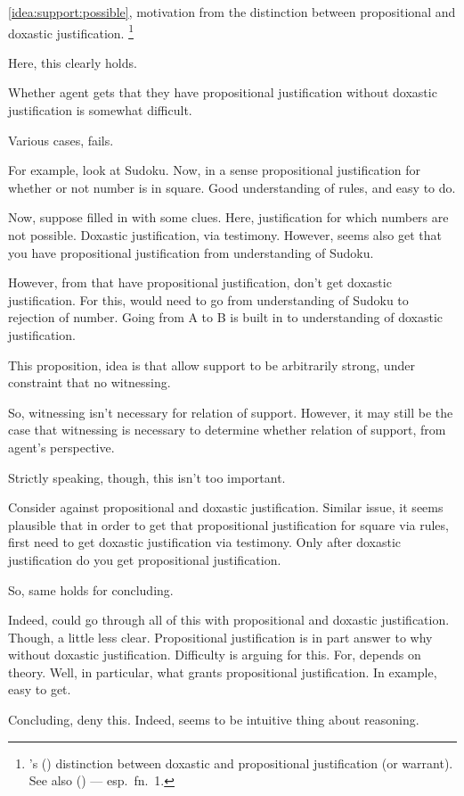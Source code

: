 \begin{note}
  \autoref{idea:support:possible}, motivation from the distinction between propositional and doxastic justification.%
  \footnote{
    \citeauthor{Firth:1978vi}'s (\citeyear{Firth:1978vi}) distinction between doxastic and propositional justification (or warrant).
    See also \citeauthor{Silva:2020aa} (\citeyear{Silva:2020aa}) --- esp.\ fn.\ 1.
  }

  Here, this clearly holds.

  Whether agent gets that they have propositional justification without doxastic justification is somewhat difficult.

  Various cases, fails.

  For example, look at Sudoku.
  Now, in a sense propositional justification for whether or not number is in square.
  Good understanding of rules, and easy to do.

  Now, suppose filled in with some clues.
  Here, justification for which numbers are not possible.
  Doxastic justification, via testimony.
  However, seems also get that you have propositional justification from understanding of Sudoku.

  However, from that have propositional justification, don't get doxastic justification.
  For this, would need to go from understanding of Sudoku to rejection of number.
  Going from A to B is built in to understanding of doxastic justification.
\end{note}

\begin{note}
  This proposition, idea is that allow support to be arbitrarily strong, under constraint that no witnessing.

  So, witnessing isn't necessary for relation of support.
  However, it may still be the case that witnessing is necessary to determine whether relation of support, from agent's perspective.

  Strictly speaking, though, this isn't too important.

  Consider against propositional and doxastic justification.
  Similar issue, it seems plausible that in order to get that propositional justification for square via rules, first need to get doxastic justification via testimony.
  Only after doxastic justification do you get propositional justification.

  So, same holds for concluding.

  Indeed, could go through all of this with propositional and doxastic justification.
  Though, a little less clear.
  Propositional justification is in part answer to why without doxastic justification.
  Difficulty is arguing for this.
  For, depends on theory.
  Well, in particular, what grants propositional justification.
  In example, easy to get.

  Concluding, deny this.
  Indeed, seems to be intuitive thing about reasoning.
\end{note}

